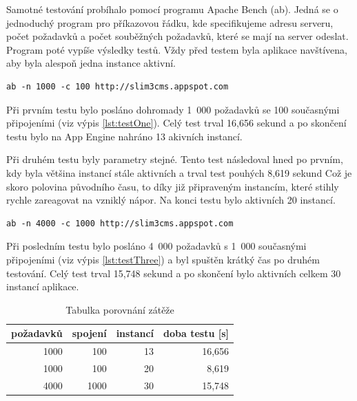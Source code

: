 Samotné testování probíhalo pomocí programu Apache Bench (ab). Jedná se o jednoduchý program pro příkazovou řádku, kde specifikujeme adresu serveru, počet požadavků a počet souběžných požadavků, které se mají na server odeslat. Program poté vypíše výsledky testů. Vždy před testem byla aplikace navštívena, aby byla alespoň jedna instance aktivní.

\lstset{language=bash}
\lstset{numbers=none}
\lstset{frame=none}
\begin{lstlisting}[caption={Testování 1000 požadavků se 100 souběžnými spojeními},label=lst:testOne,belowcaptionskip=0.4cm]
ab -n 1000 -c 100 http://slim3cms.appspot.com
\end{lstlisting}

Při prvním testu bylo posláno dohromady 1~000 požadavků se 100 současnými připojeními (viz výpis \ref{lst:testOne}). Celý test trval 16,656 sekund a po skončení testu bylo na App Engine nahráno 13 akivních instancí.

Při druhém testu byly parametry stejné. Tento test následoval hned po prvním, kdy byla většina instancí stále aktivních a trval test pouhých 8,619 sekund Což je skoro polovina původního času, to díky již připraveným instancím, které stihly rychle zareagovat na vzniklý nápor. Na konci testu bylo aktivních 20 instancí.

\begin{lstlisting}[caption={Testování 4000 požadavků s 1000 souběžnými spojeními},label=lst:testThree,belowcaptionskip=0.4cm]
ab -n 4000 -c 1000 http://slim3cms.appspot.com
\end{lstlisting}

Při posledním testu bylo posláno 4~000 požadavků s 1~000 současnými připojeními (viz výpis \ref{lst:testThree}) a byl spuštěn krátký čas po druhém testování. Celý test trval 15,748 sekund a po skončení bylo aktivních celkem 30 instancí aplikace.

\begin{table}[h]
\centering
\caption{Tabulka porovnání zátěže}\label{tab:requestTest}
\begin{tabular}{|r|r|r|r|}
   \hline
požadavků	& spojení	& instancí	& doba testu [s]	\\
   \hline
1000			& 100	& 13		& 16,656	\\
1000			& 100	& 20		& 8,619 	\\
4000			& 1000	& 30		& 15,748	 \\
   \hline
\end{tabular}
\end{table}

